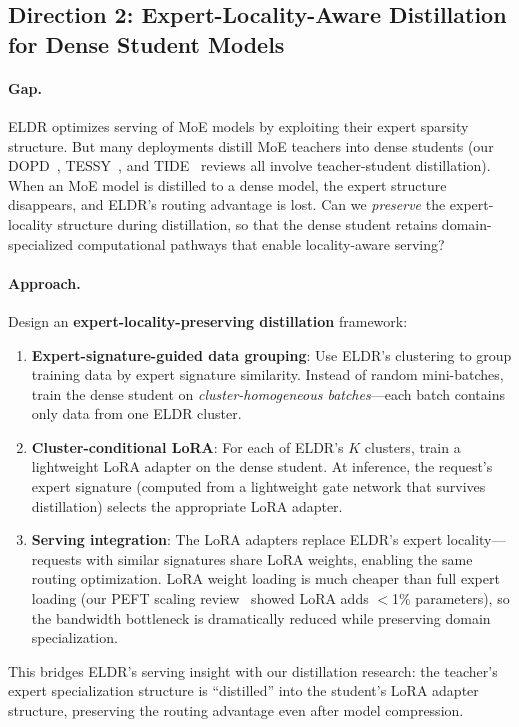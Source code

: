 \documentclass[11pt,a4paper]{article}
\begin{document}
\subsection{Direction 2: Expert-Locality-Aware Distillation for Dense Student Models}

\paragraph{Gap.} ELDR optimizes serving of MoE models by exploiting their expert sparsity structure. But many deployments distill MoE teachers into dense students (our DOPD~\cite{yu2026dopd}, TESSY~\cite{tessy2026}, and TIDE~\cite{tide2026} reviews all involve teacher-student distillation). When an MoE model is distilled to a dense model, the expert structure disappears, and ELDR's routing advantage is lost. Can we \emph{preserve} the expert-locality structure during distillation, so that the dense student retains domain-specialized computational pathways that enable locality-aware serving?

\paragraph{Approach.} Design an \textbf{expert-locality-preserving distillation} framework:
\begin{enumerate}
\item \textbf{Expert-signature-guided data grouping}: Use ELDR's clustering to group training data by expert signature similarity. Instead of random mini-batches, train the dense student on \emph{cluster-homogeneous batches}---each batch contains only data from one ELDR cluster.
\item \textbf{Cluster-conditional LoRA}: For each of ELDR's $K$ clusters, train a lightweight LoRA adapter on the dense student. At inference, the request's expert signature (computed from a lightweight gate network that survives distillation) selects the appropriate LoRA adapter.
\item \textbf{Serving integration}: The LoRA adapters replace ELDR's expert locality---requests with similar signatures share LoRA weights, enabling the same routing optimization. LoRA weight loading is much cheaper than full expert loading (our PEFT scaling review~\cite{peft2026} showed LoRA adds $<$1\% parameters), so the bandwidth bottleneck is dramatically reduced while preserving domain specialization.
\end{enumerate}
This bridges ELDR's serving insight with our distillation research: the teacher's expert specialization structure is ``distilled'' into the student's LoRA adapter structure, preserving the routing advantage even after model compression.
\end{document}
